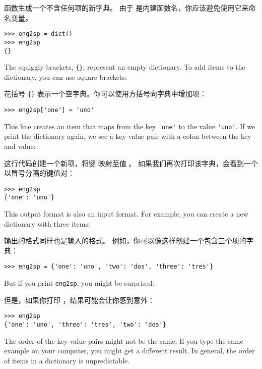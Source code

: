  函数生成一个不含任何项的新字典。 由于  是内建函数名，你应该避免使用它来命名变量。

  

\begin{lstlisting}
>>> eng2sp = dict()
>>> eng2sp
{}
\end{lstlisting}

The squiggly-brackets, \verb"{}", represent an empty dictionary.
To add items to the dictionary, you can use square brackets:

花括号 \verb"{}" 表示一个空字典。你可以使用方括号向字典中增加项：

  

\begin{lstlisting}
>>> eng2sp['one'] = 'uno'
\end{lstlisting}

%
This line creates an item that maps from the key
\verb"'one'" to the value \verb"'uno'".  If we print the
dictionary again, we see a key-value pair with a colon
between the key and value:

这行代码创建一个新项，将键  映射至值 。
如果我们再次打印该字典，会看到一个以冒号分隔的键值对：

\begin{lstlisting}
>>> eng2sp
{'one': 'uno'}
\end{lstlisting}

%
This output format is also an input format.  For example,
you can create a new dictionary with three items:

输出的格式同样也是输入的格式。 例如，你可以像这样创建一个包含三个项的字典：

\begin{lstlisting}
>>> eng2sp = {'one': 'uno', 'two': 'dos', 'three': 'tres'}
\end{lstlisting}

%
But if you print {\tt eng2sp}, you might be surprised:

但是，如果你打印  ，结果可能会让你感到意外：

\begin{lstlisting}
>>> eng2sp
{'one': 'uno', 'three': 'tres', 'two': 'dos'}
\end{lstlisting}

%
The order of the key-value pairs might not be the same.  If
you type the same example on your computer, you might get a
different result.  In general, the order of items in
a dictionary is unpredictable.

